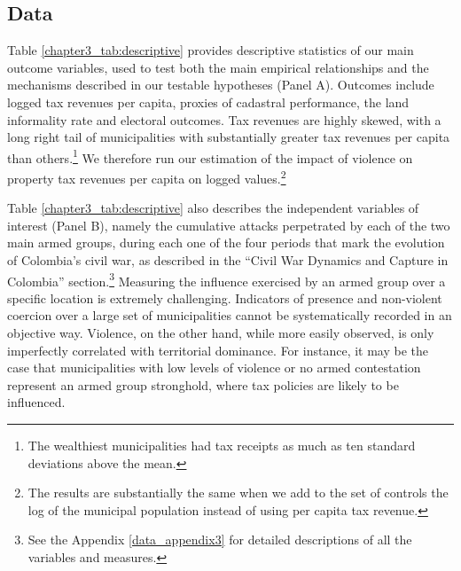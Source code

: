 \subsection{Data}

Table \ref{chapter3_tab:descriptive} provides descriptive statistics of our main outcome variables, used to test both the main empirical relationships and the mechanisms described in our testable hypotheses (Panel A). Outcomes include logged tax revenues per capita, proxies of cadastral performance, the land informality rate and electoral outcomes. Tax revenues are highly skewed, with a long right tail of municipalities with substantially greater tax revenues per capita than others.\footnote{The wealthiest municipalities had tax receipts as much as ten standard deviations above the mean.} We therefore run our estimation of the impact of violence on property tax revenues per capita on logged values.\footnote{The results are substantially the same when we add to the set of controls the log of the municipal population instead of using per capita tax revenue.}

Table \ref{chapter3_tab:descriptive} also describes the independent variables of interest (Panel B), namely the cumulative attacks perpetrated by each of the two main armed groups, during each one of the four periods that mark the evolution of Colombia's civil war, as described in the ``Civil War Dynamics and Capture in Colombia'' section.\footnote{See the Appendix \ref{data_appendix3} for detailed descriptions of all the variables and measures.} Measuring the influence exercised by an armed group over a specific location is extremely challenging. Indicators of presence and non-violent coercion over a large set of municipalities cannot be systematically recorded in an objective way. Violence, on the other hand, while more easily observed, is only imperfectly correlated with territorial dominance. For instance, it may be the case that municipalities with low levels of violence or no armed contestation represent an armed group stronghold, where tax policies are likely to be influenced.




